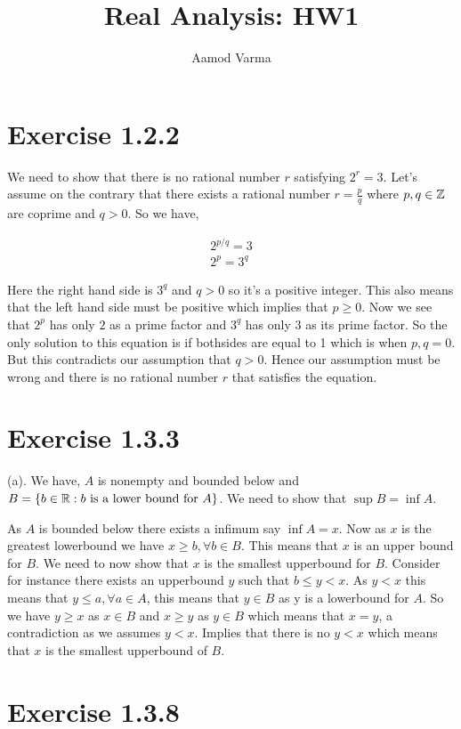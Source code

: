 \documentclass[a4paper]{report}
\title{Real Analysis: HW1}
\author{Aamod Varma}
\begin{document}
\maketitle
\date{}
    



\section*{Exercise 1.2.2}

We need to show that there is no rational number $r$ satisfying $2^{r} = 3$. Let's assume on the contrary that there exists a rational number $r = \frac{p}{q}$ where $p,q \in \mathbb{Z}$ are coprime and $q > 0$. So we have,  
 
\begin{align*}
    2^{p /q} = 3\\
    2^{p} = 3^{q}
\end{align*}

Here the right hand side is $3^{q}$ and $q > 0$ so it's a positive integer. This also means that the left hand side must be positive which implies that $p \ge 0$. Now we see that  $2^{p}$ has only $2$ as a prime factor and $3^{q}$ has only $3$ as its prime factor. So the only solution to this equation is if bothsides are equal to 1 which is when $p,q = 0$. But this contradicts our assumption that $q > 0$. Hence our assumption must be wrong and there is no  rational number $r$ that satisfies the equation.
\section*{Exercise 1.3.3}
(a). We have, $A$ is nonempty and bounded below and $B = \{b \in \mathbb{R}: b \text{ is a lower bound for } A\}$. We need to show that  $\sup B = \inf A$.

As $A$ is bounded below there exists a infimum say $\inf A = x$. Now as $x$ is the greatest lowerbound we have  $x \ge b, \forall b \in B$. This means that $x$ is an upper bound for $B$. We need to now show that $ x$ is the smallest upperbound for $B$. Consider for instance there exists an upperbound $y$ such that $ b \le y < x$.  As $y < x$ this means that  $y \le a, \forall a \in A$, this means that  $y \in B$ as y is a lowerbound for  $A$. So we have $y \ge x$ as  $x \in B$ and $x \ge y$ as  $y \in B$ which means that  $x = y$, a contradiction as we assumes $y < x $. Implies that there is no  $y < x$ which means that  $x$ is the smallest upperbound of  $B$.

\section*{Exercise 1.3.8}
\end{document}
